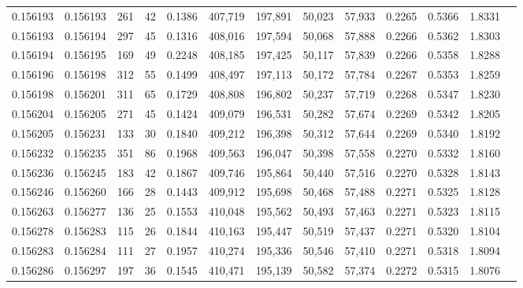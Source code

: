 \begin{tabular}{rrrrrrrrrrrrr}
0.156193 & 0.156193 &   261 &  42 &                                     0.1386 & 407,719 & 197,891 &  50,023 &  57,933 & 0.2265 & 0.5366 & 1.8331 \\
0.156193 & 0.156194 &   297 &  45 &                                     0.1316 & 408,016 & 197,594 &  50,068 &  57,888 & 0.2266 & 0.5362 & 1.8303 \\
0.156194 & 0.156195 &   169 &  49 &                                     0.2248 & 408,185 & 197,425 &  50,117 &  57,839 & 0.2266 & 0.5358 & 1.8288 \\
0.156196 & 0.156198 &   312 &  55 &                                     0.1499 & 408,497 & 197,113 &  50,172 &  57,784 & 0.2267 & 0.5353 & 1.8259 \\
0.156198 & 0.156201 &   311 &  65 &                                     0.1729 & 408,808 & 196,802 &  50,237 &  57,719 & 0.2268 & 0.5347 & 1.8230 \\
0.156204 & 0.156205 &   271 &  45 &                                     0.1424 & 409,079 & 196,531 &  50,282 &  57,674 & 0.2269 & 0.5342 & 1.8205 \\
0.156205 & 0.156231 &   133 &  30 &                                     0.1840 & 409,212 & 196,398 &  50,312 &  57,644 & 0.2269 & 0.5340 & 1.8192 \\
0.156232 & 0.156235 &   351 &  86 &                                     0.1968 & 409,563 & 196,047 &  50,398 &  57,558 & 0.2270 & 0.5332 & 1.8160 \\
0.156236 & 0.156245 &   183 &  42 &                                     0.1867 & 409,746 & 195,864 &  50,440 &  57,516 & 0.2270 & 0.5328 & 1.8143 \\
0.156246 & 0.156260 &   166 &  28 &                                     0.1443 & 409,912 & 195,698 &  50,468 &  57,488 & 0.2271 & 0.5325 & 1.8128 \\
0.156263 & 0.156277 &   136 &  25 &                                     0.1553 & 410,048 & 195,562 &  50,493 &  57,463 & 0.2271 & 0.5323 & 1.8115 \\
0.156278 & 0.156283 &   115 &  26 &                                     0.1844 & 410,163 & 195,447 &  50,519 &  57,437 & 0.2271 & 0.5320 & 1.8104 \\
0.156283 & 0.156284 &   111 &  27 &                                     0.1957 & 410,274 & 195,336 &  50,546 &  57,410 & 0.2271 & 0.5318 & 1.8094 \\
0.156286 & 0.156297 &   197 &  36 &                                     0.1545 & 410,471 & 195,139 &  50,582 &  57,374 & 0.2272 & 0.5315 & 1.8076 \\

\end{tabular}
